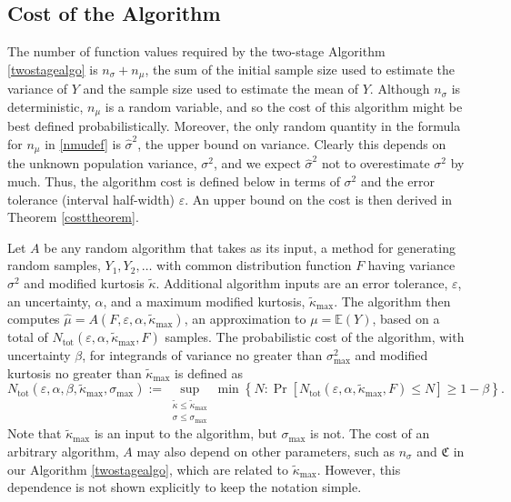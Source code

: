 \documentclass[graybox]{svmult}
\newcommand{\fudge}{\mathfrak{C}}
\newcommand\e{\mathbb{E}}
\newcommand{\Prob}{\Pr}
\newcommand{\hmu}{\hat{\mu}}
\newcommand{\hsigma}{\hat{\sigma}}
\newcommand{\tkappa}{\tilde{\kappa}}
\begin{document}
\subsection{Cost of the Algorithm}  The number of function values required by the two-stage Algorithm \ref{twostagealgo} is $n_{\sigma}+n_\mu$, the sum of the initial sample size used to estimate the variance of $Y$ and the sample size used to estimate the mean of $Y$.  Although $n_{\sigma}$ is deterministic, $n_\mu$ is a random variable, and so the cost of this algorithm might be best defined probabilistically.  Moreover, the only random quantity in the formula for $n_{\mu}$ in \eqref{nmudef} is $\hsigma^2$, the upper bound on variance.  Clearly this depends on the unknown population variance, $\sigma^2$, and we expect $\hsigma^2$ not to overestimate $\sigma^2$ by much.  Thus, the algorithm cost is defined below in terms of $\sigma^2$ and the error tolerance (interval half-width) $\varepsilon$.  An upper bound on the cost is then derived in Theorem \ref{costtheorem}.

Let $A$ be any random algorithm that takes as its input, a method for generating random samples, $Y_1, Y_2, \ldots $ with common distribution function $F$ having variance $\sigma^2$ and modified kurtosis $\tkappa$.  Additional algorithm inputs are an error tolerance, $\varepsilon$, an uncertainty, $\alpha$, and a maximum modified kurtosis, $\tkappa_{\max}$.  The algorithm then computes $\hmu=A(F,\varepsilon,\alpha,\tkappa_{\max})$, an approximation to $\mu=\e(Y)$, based on a total of $N_{\text{tot}}(\varepsilon,\alpha,\tkappa_{\max},F)$ samples. The probabilistic cost of the algorithm, with uncertainty $\beta$, for integrands of variance no greater than $\sigma^2_{\max}$ and modified kurtosis no greater than $\tkappa_{\max}$ is defined as 
\begin{equation*}
N_{\text{tot}}(\varepsilon,\alpha,\beta,\tkappa_{\max},\sigma_{\max})
:= \sup_{\substack{\tkappa \le \tkappa_{\max} \\ \sigma \le \sigma_{\max}} } \min\left\{N : \Prob[N_{\text{tot}}(\varepsilon,\alpha,\tkappa_{\max},F) \le N] \ge 1-\beta  \right \}.
\end{equation*}
Note that $\tkappa_{\max}$ is an input to the algorithm, but $\sigma_{\max}$ is not.  The cost of an arbitrary algorithm, $A$ may also depend on other parameters, such as $n_\sigma$ and $\fudge$ in our Algorithm \ref{twostagealgo}, which are related to $\tkappa_{\max}$.  However, this dependence is not shown explicitly to keep the notation simple.
\end{document}
